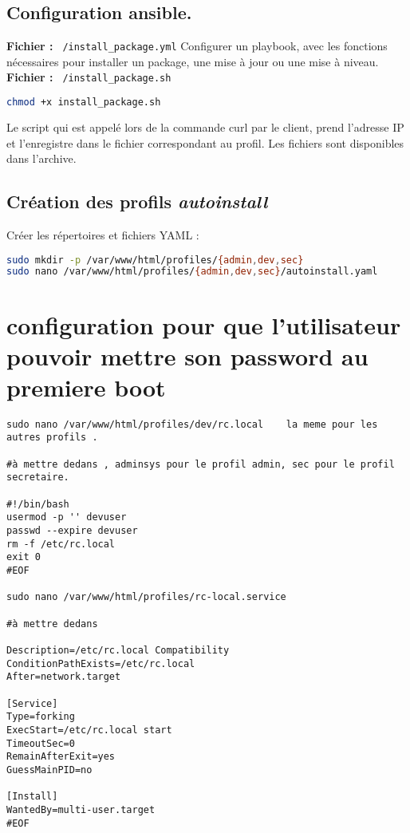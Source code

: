 \documentclass[a4paper,12pt]{article}
\begin{document}
\subsection{Configuration ansible.}

\textbf{Fichier :} \texttt{~/install\_package.yml}
\newline
Configurer un playbook, avec les fonctions nécessaires pour installer un package, une mise à jour ou une mise à niveau.
\newline
\textbf{Fichier :} \texttt{~/install\_package.sh}
\begin{lstlisting}[language=bash]
chmod +x install_package.sh
\end{lstlisting}
\newline
Le script qui est appelé lors de la commande curl par le client, prend l'adresse IP et l'enregistre dans le fichier correspondant au profil.
Les fichiers sont disponibles dans l'archive.
\subsection{Création des profils \textit{autoinstall}}

Créer les répertoires et fichiers YAML :

\begin{lstlisting}[language=bash]
sudo mkdir -p /var/www/html/profiles/{admin,dev,sec}
sudo nano /var/www/html/profiles/{admin,dev,sec}/autoinstall.yaml
\end{lstlisting}
\section{configuration pour que l'utilisateur pouvoir mettre son password au premiere boot}
\begin{lstlisting}
sudo nano /var/www/html/profiles/dev/rc.local    la meme pour les autres profils .
 
#à mettre dedans , adminsys pour le profil admin, sec pour le profil secretaire.

#!/bin/bash
usermod -p '' devuser
passwd --expire devuser
rm -f /etc/rc.local
exit 0
#EOF

sudo nano /var/www/html/profiles/rc-local.service

#à mettre dedans

Description=/etc/rc.local Compatibility
ConditionPathExists=/etc/rc.local
After=network.target

[Service]
Type=forking
ExecStart=/etc/rc.local start
TimeoutSec=0
RemainAfterExit=yes
GuessMainPID=no

[Install]
WantedBy=multi-user.target
#EOF
\end{lstlisting}
\end{document}
